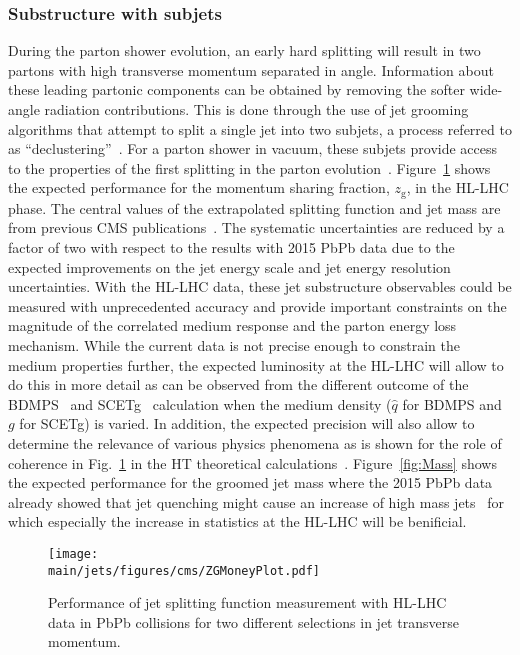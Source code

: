 \subsubsection{Substructure with subjets}
During the parton shower evolution, an early hard splitting will result in two partons with high transverse momentum separated in angle. Information about these leading partonic components can be obtained by removing the softer wide-angle radiation contributions. This is done through the use of jet grooming algorithms that attempt to split a single jet into two subjets, a process referred to as ``declustering''~\cite{Ellis:2009me,Butterworth:2008iy,Krohn:2009th,Dasgupta:2013ihk,Larkoski:2014wba}. For a parton shower in vacuum, these subjets provide access to the properties of the first splitting in the parton evolution~\cite{Altarelli:1977zs,Larkoski:2015lea}. Figure~\ref{fig:ZG} shows the expected performance for the momentum sharing fraction, $z_{\mathrm{g}}$, in the HL-LHC phase. The central values of the extrapolated splitting function and jet mass are from previous CMS publications~\cite{Sirunyan:2017bsd,Sirunyan:2018gct}. The systematic uncertainties are reduced by a factor of two with respect to the results with 2015 PbPb data due to the expected improvements on the jet energy scale and jet energy resolution uncertainties. With the HL-LHC data, these jet substructure observables could be measured with unprecedented accuracy and provide important constraints on the magnitude of the correlated medium response and the parton energy loss mechanism. While the current data is not precise enough to constrain the medium properties further, the expected luminosity at the HL-LHC will allow to do this in more detail as can be observed from the different outcome of the BDMPS~\cite{Mehtar-Tani:2016aco} and SCETg~\cite{Chien:2016led} calculation when the medium density ($\hat{q}$ for BDMPS and $g$ for SCETg) is varied. In addition, the expected precision will also allow to determine the relevance of various physics phenomena as is shown for the role of coherence in Fig.~\ref{fig:ZG} in the HT theoretical calculations~\cite{Chang:2017gkt}. Figure~\ref{fig:Mass} shows the expected performance for the groomed jet mass where the 2015 PbPb data already showed that jet quenching might cause an increase of high mass jets~\cite{Sirunyan:2018gct} for which especially the increase in statistics at the HL-LHC will be benificial.
\begin{figure}[!ht]
\begin{center}
\texttt{[image: \\main/jets/figures/cms/ZGMoneyPlot.pdf]}
\caption{Performance of jet splitting function measurement with HL-LHC data in PbPb collisions for two different selections in jet transverse momentum.~\cite{CMS-FTR-17-002:2017dec}}
\label{fig:ZG}
\end{center}
\end{figure}
